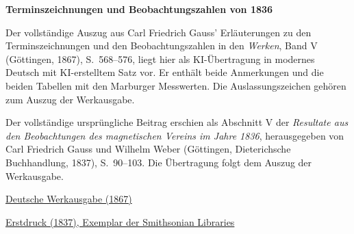 \clearpage
\thispagestyle{empty}
\begin{center}\Large\textbf{Terminszeichnungen und Beobachtungszahlen von 1836}\end{center}

Der vollständige Auszug aus Carl Friedrich Gauss’ Erläuterungen zu den Terminszeichnungen und den Beobachtungszahlen in den \textit{Werken}, Band V (Göttingen, 1867), S.~568--576, liegt hier als KI-Übertragung in modernes Deutsch mit KI-erstelltem Satz vor. Er enthält beide Anmerkungen und die beiden Tabellen mit den Marburger Messwerten. Die Auslassungszeichen gehören zum Auszug der Werkausgabe.

Der vollständige ursprüngliche Beitrag erschien als Abschnitt V der \textit{Resultate aus den Beobachtungen des magnetischen Vereins im Jahre 1836}, herausgegeben von Carl Friedrich Gauss und Wilhelm Weber (Göttingen, Dieterichsche Buchhandlung, 1837), S.~90--103. Die Übertragung folgt dem Auszug der Werkausgabe.

\medskip\noindent
\href{https://gdz.sub.uni-goettingen.de/id/PPN236006339}{Deutsche Werkausgabe (1867)}\par
\noindent\href{https://archive.org/details/ResultateausdenBd1Gaus/page/n95/mode/2up}{Erstdruck (1837), Exemplar der Smithsonian Libraries}
\clearpage
